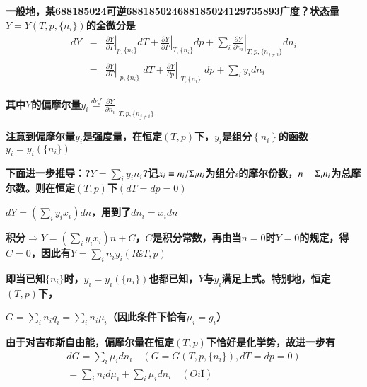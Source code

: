 \documentclass{article} %
\begin{document}
\noindent 
{\bf 一般地，某688185024可逆688185024688185024129735893广度？状态量$Y=Y\left(T,p,\{ n_{i} \} \right)$的全微分是
\[\begin{array}{rcl} {dY} & {=} & {\left. \frac{\partial Y}{\partial T} \right|_{p,\{ n_{i} \} } dT+\left. \frac{\partial Y}{\partial P} \right|_{T,\{ n_{i} \} } dp+\sum _{i}\left. \frac{\partial Y}{\partial n_{i} } \right| _{T,p,\{ n_{j\ne i} \} } dn_{i} } \\ {} & {=} & {\left. \frac{\partial Y}{\partial T} \right|_{\begin{array}{c} {p,\{ n_{i} \} } \end{array}} dT+\left. \frac{\partial Y}{\partial p} \right|_{\begin{array}{c} {T,\{ n_{i} \} } \end{array}} dp+{\mathop{\sum }\limits_{i}} y_{i} dn_{i} } \end{array}\] }

{\bf 其中$Y$的偏摩尔量$y_{i} {\mathop{=}\limits^{def}} \left. \frac{\partial Y}{\partial n_{i} } \right|_{T,p,\{ n_{j\ne i} \} } $}

\noindent 
{\bf 注意到偏摩尔量$y_{i} $是强度量，在恒定$(T,p)$下，$y_{i} $是组分$\left\{n_{i} \right\}$的函数$y_{i} =y_{i} (\{ n_{i} \} )$}


{\bf  下面进一步推导：?$Y=\sum _{i}y_{i} n_{i}  $?记$x_{i} \equiv n_{i} /{\rm \Sigma }_{i} n_{i} $为组分$i$的摩尔份数，$n={\rm \Sigma }_{i} n_{i} $为总摩尔数。则在恒定$(T,p)$下$(dT=dp=0)$}

\noindent 
{\bf $dY=(\sum _{i}y_{i} x_{i}  )dn$，用到了$dn_{i} =x_{i} dn$}

\noindent 
{\bf 积分$\Rightarrow Y=({\mathop{\sum }\limits_{i}} y_{i} x_{i} )n+C$，$C$是积分常数，再由当$n=0$时$Y=0$的规定，得$C=0$，因此有$Y={\mathop{\sum }\limits_{i}} n_{i} y_{i} (RšT,p)$}

\noindent 
{\bf 即当已知$\{ n_{i} \} $时，$y_{i} =y_{i} (\{ n_{i} \} )$也都已知，$Y$与$y_{i} $满足上式。特别地，恒定$(T,p)$下，}

\noindent 
{\bf $G=\sum _{i}n_{i} q_{i}  =\sum _{i}n_{i} \mu _{i}  $（因此条件下恰有$\mu _{i} =g_{i} $）}

\noindent 
{\bf 由于对吉布斯自由能，偏摩尔量在恒定$(T,p)$下恰好是化学势，故进一步有
\[\begin{array}{c} {dG={\mathop{\sum }\limits_{i}} \mu _{i} dn_{i} \quad (G=G(T,p,\{ n_{i} \} ),dT=dp=0)} \\ {={\mathop{\sum }\limits_{i}} n_{i} d\mu _{i} +{\mathop{\sum }\limits_{i}} \mu _{i} dn_{i} \quad (OiÏ)} \end{array}\] }
\end{document}
